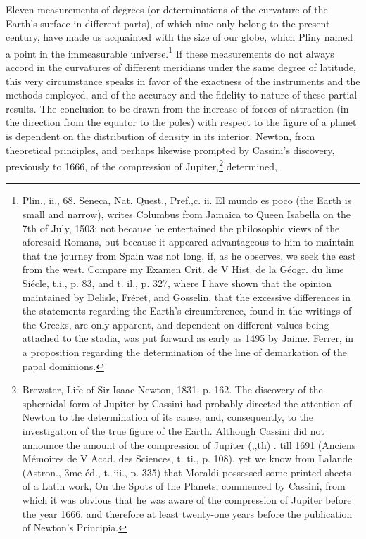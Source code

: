 Eleven measurements of degrees (or determinations of the curvature of the Earth's surface in different parts), of which nine only belong to the present century, have made us acquainted with the size of our globe, which Pliny named a point in the immeasurable universe.\footnote{Plin., ii., 68. Seneca, Nat. Quest., Pref.,c. ii. El mundo es poco (the Earth is small and narrow), writes Columbus from Jamaica to Queen Isabella on the 7th of July, 1503; not because he entertained the philosophic views of the aforesaid Romans, but because it appeared advantageous to him to maintain that the journey from Spain was not long, if, as he observes, we seek the east from the west. Compare my Examen Crit. de V Hist. de la G\'{e}ogr. du lime Si\'{e}cle, t.i., p. 83, and t. il., p. 327, where I have shown that the opinion maintained by Delisle, Fr\'{e}ret, and Gosselin, that the excessive differences in the statements regarding the Earth's circumference, found in the writings of the Greeks, are only apparent, and dependent on different values being attached to the stadia, was put forward as early as 1495 by Jaime. Ferrer, in a proposition regarding the determination of the line of demarkation of the papal dominions.} If these measurements do not always accord in the curvatures of different meridians under the same degree of latitude, this very circumstance speaks in favor of the exactness of the instruments and the methods employed, and of the accuracy and the fidelity to nature of these partial results. The conclusion to be drawn from the increase of forces of attraction (in the direction from the equator to the poles) with respect to the figure of a planet is dependent on the distribution of density in its interior. Newton, from theoretical principles, and perhaps likewise prompted by Cassini's discovery, previously to 1666, of the compression of Jupiter,\footnote{Brewster, Life of Sir Isaac Newton, 1831, p. 162. The discovery of the spheroidal form of Jupiter by Cassini had probably directed the attention of Newton to the determination of its cause, and, consequently, to the investigation of the true figure of the Earth. Although Cassini did not announce the amount of the compression of Jupiter (,,th) . till 1691 (Anciens M\'{e}moires de V Acad. des Sciences, t. ti., p. 108), yet we know from Lalande (Astron., 3me \'{e}d., t. iii., p. 335) that Moraldi possessed some printed sheets of a Latin work, On the Spots of the Planets, commenced by Cassini, from which it was obvious that he was aware of the compression of Jupiter before the year 1666, and therefore at least twenty-one years before the publication of Newton's Principia.} determined,


